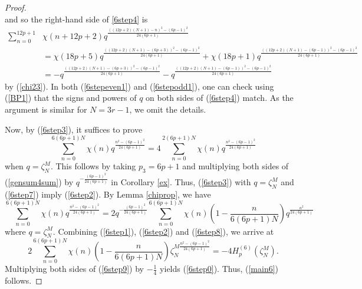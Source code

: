 \documentclass[11pt,reqno]{amsart}
\theoremstyle{definition}
\numberwithin{equation}{section}
\renewcommand{\=}{\;=\;}
\begin{document}
\begin{proof}
\begin{equation*}
\end{equation*}
and so the right-hand side of \eqref{6step4} is
\begin{equation} \label{6stepodd1}
\begin{aligned}
\sum_{n=0}^{12p+1}& \chi(n+12p+2) q^{\frac{((12p+2)(N+1) - n)^2 - (6p-1)^2}{24(6p+1)}} \\
&= \chi(18p+5) q^{\frac{((12p+2)(N+1) - (6p+3))^2 - (6p-1)^2}{24(6p+1)}} + \chi(18p+1) q^{\frac{((12p+2)(N+1) - (6p-1))^2 - (6p-1)^2}{24(6p+1)}} \\
&= -q^{\frac{((12p+2)(N+1) - (6p+3))^2 - (6p-1)^2}{24(6p+1)}} - q^{\frac{((12p+2)(N+1) - (6p-1))^2 - (6p-1)^2}{24(6p+1)}}
\end{aligned}
\end{equation}
by (\ref{chi23}). In both (\ref{6stepeven1}) and (\ref{6stepodd1}), one can check using (\ref{BP1}) that the signs and powers of $q$ on both sides of (\ref{6step4}) match.  As the argument is similar for $N=3r-1$, we omit the details. 

Now, by (\ref{6step3}), it suffices to prove
\begin{equation} \label{6step7}
\sum_{n=0}^{6(6p+1)N} \chi(n) q^{\frac{n^2 - (6p-1)^2}{24(6p+1)}} = 4 \sum_{n=0}^{2(6p+1)N} \chi(n) q^{\frac{n^2 - (6p-1)^2}{24(6p+1)}}
\end{equation}
when $q =\zeta_N^{M}$. This follows by taking $p_3=6p+1$ and multiplying both sides of (\ref{gensum4sum}) by $q^{-\frac{(6p-1)^2}{24(6p+1)}}$ in Corollary \ref{ex}. Thus, (\ref{6step3}) with $q=\zeta_N^{M}$ and (\ref{6step7}) imply (\ref{6step2}). By Lemma \ref{chiprop}, we have
\begin{equation} \label{6step8}
\sum_{n=0}^{6(6p+1)N} \chi(n) q^{\frac{n^2 - (6p-1)^2}{24(6p+1)}} = 2 q^{-\frac{(6p-1)^2}{24(6p+1)}} \sum_{n=0}^{6(6p+1)N} \chi(n) \left( 1 - \frac{n}{6(6p+1)N} \right) q^{\frac{n^2}{24(6p+1)}}
\end{equation}
where $q=\zeta_N^{M}$. Combining (\ref{6step1}), (\ref{6step2}) and (\ref{6step8}), we arrive at
\begin{equation} \label{6step9}
2 \sum_{n=0}^{6(6p+1)N} \chi(n) \left( 1 - \frac{n}{6(6p+1)N} \right) \zeta_N^{M \frac{n^2 - (6p-1)^2}{24(6p+1)}}  = -4 H_{p}^{(6)}(\zeta_N^{M}). 
\end{equation}
Multiplying both sides of (\ref{6step9}) by $-\frac{1}{4}$ yields (\ref{6step0}). Thus, (\ref{main6}) follows.


\end{proof}
\end{document}
